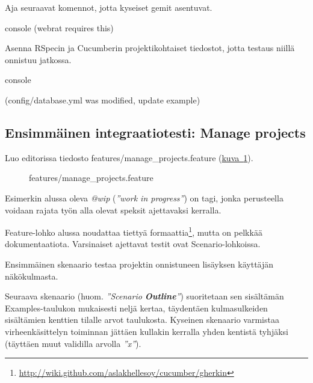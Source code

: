 \documentclass{article}
\newenvironment{myfigure}{
  \begin{figure}
    \centering
    \begin{lrbox}{\myfigurebox}
      \begin{minipage}{0.8\textwidth}
}{
      \end{minipage}
    \end{lrbox}
    \fcolorbox{blue}{blue!1}{\usebox{\myfigurebox}}
  \end{figure}
}
\newcommand{\myref}[2]{\hyperref[#2]{#1~\ref*{#2}}}
\newcommand{\pdfforeignlanguage}[2]{\texorpdfstring{\foreignlanguage{#1}{#2}}{#2}}
\newcommand{\eng}[1]{\pdfforeignlanguage{english}{#1}}
\begin{document}
\begin{samepage}
Aja seuraavat komennot, jotta kyseiset gemit asentuvat.

\begin{pygmented}{console}
(webrat requires this)

\end{pygmented}
\end{samepage}

\begin{samepage}
Asenna RSpecin ja Cucumberin projektikohtaiset tiedostot, jotta testaus niillä
onnistuu jatkossa.

\begin{pygmented}{console}

(config/database.yml was modified, update example)

\end{pygmented}
\end{samepage}

\subsection{Ensimmäinen integraatiotesti: \eng{Manage projects}}

Luo editorissa tiedosto features/manage\_projects.feature
(\myref{kuva}{fig:manage-projects-feature}).

\begin{myfigure}
\caption{features/manage\_projects.feature}
\label{fig:manage-projects-feature}
\end{myfigure}

Esimerkin alussa oleva \emph{@wip} (\emph{''\eng{work in progress}''}) on tagi,
jonka perusteella voidaan rajata työn alla olevat speksit ajettavaksi kerralla.

\eng{Feature}-lohko alussa noudattaa tiettyä
formaattia\footnote{\url{http://wiki.github.com/aslakhellesoy/cucumber/gherkin}},
mutta on pelkkää dokumentaatiota. Varsinaiset ajettavat testit ovat
\eng{Scenario}-lohkoissa.

Ensimmäinen skenaario testaa projektin onnistuneen lisäyksen käyttäjän
näkökulmasta.

Seuraava skenaario (huom. \emph{''\eng{Scenario \textbf{Outline}}''})
suoritetaan sen sisältämän \eng{Examples}-taulukon mukaisesti neljä kertaa,
täydentäen kulmasulkeiden sisältämien kenttien tilalle arvot taulukosta.
Kyseinen skenaario varmistaa virheenkäsittelyn toiminnan jättäen kullakin
kerralla yhden kentistä tyhjäksi (täyttäen muut validilla arvolla
\emph{''x''}).
\end{document}

